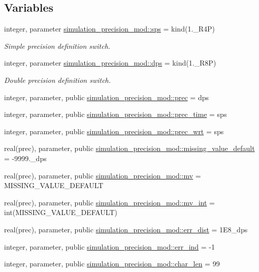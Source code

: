 \subsection*{Variables}
\begin{DoxyCompactItemize}
\item 
integer, parameter \mbox{\hyperlink{namespacesimulation__precision__mod_aa9eb32e6c7ef6d6f0b9c7df435105e88}{simulation\+\_\+precision\+\_\+mod\+::sps}} = kind(1.\+\_\+\+R4P)
\begin{DoxyCompactList}\small\item\em Simple precision definition switch. \end{DoxyCompactList}\item 
integer, parameter \mbox{\hyperlink{namespacesimulation__precision__mod_afa656a8f79bdee9d705fb5988ae40123}{simulation\+\_\+precision\+\_\+mod\+::dps}} = kind(1.\+\_\+\+R8P)
\begin{DoxyCompactList}\small\item\em Double precision definition switch. \end{DoxyCompactList}\item 
integer, parameter, public \mbox{\hyperlink{namespacesimulation__precision__mod_aaff1ddf996761a1e11e787d63e1612f6}{simulation\+\_\+precision\+\_\+mod\+::prec}} = dps
\item 
integer, parameter, public \mbox{\hyperlink{namespacesimulation__precision__mod_a3833ad1bc52c3738ac861591b7492737}{simulation\+\_\+precision\+\_\+mod\+::prec\+\_\+time}} = sps
\item 
integer, parameter, public \mbox{\hyperlink{namespacesimulation__precision__mod_ad515822198607dfee68a6ed8b246c7da}{simulation\+\_\+precision\+\_\+mod\+::prec\+\_\+wrt}} = sps
\item 
real(prec), parameter, public \mbox{\hyperlink{namespacesimulation__precision__mod_a1fb0f91226452bb43d4c61cae32a9a6d}{simulation\+\_\+precision\+\_\+mod\+::missing\+\_\+value\+\_\+default}} = -\/9999.\+\_\+dps
\item 
real(prec), parameter, public \mbox{\hyperlink{namespacesimulation__precision__mod_a39845d8a0d331a7b9225feb5fe19ba3b}{simulation\+\_\+precision\+\_\+mod\+::mv}} = M\+I\+S\+S\+I\+N\+G\+\_\+\+V\+A\+L\+U\+E\+\_\+\+D\+E\+F\+A\+U\+LT
\item 
real(prec), parameter, public \mbox{\hyperlink{namespacesimulation__precision__mod_abcad51274c804cb573d8f5720c5dfa05}{simulation\+\_\+precision\+\_\+mod\+::mv\+\_\+int}} = int(M\+I\+S\+S\+I\+N\+G\+\_\+\+V\+A\+L\+U\+E\+\_\+\+D\+E\+F\+A\+U\+LT)
\item 
real(prec), parameter, public \mbox{\hyperlink{namespacesimulation__precision__mod_ae3222dd2d51f6b7221be1ca1c70e3e6c}{simulation\+\_\+precision\+\_\+mod\+::err\+\_\+dist}} = 1\+E8\+\_\+dps
\item 
integer, parameter, public \mbox{\hyperlink{namespacesimulation__precision__mod_a82a4b689dc26018c961193b991c489d4}{simulation\+\_\+precision\+\_\+mod\+::err\+\_\+ind}} = -\/1
\item 
integer, parameter, public \mbox{\hyperlink{namespacesimulation__precision__mod_a8a3305091ff953708508525398aa7129}{simulation\+\_\+precision\+\_\+mod\+::char\+\_\+len}} = 99
\end{DoxyCompactItemize}
